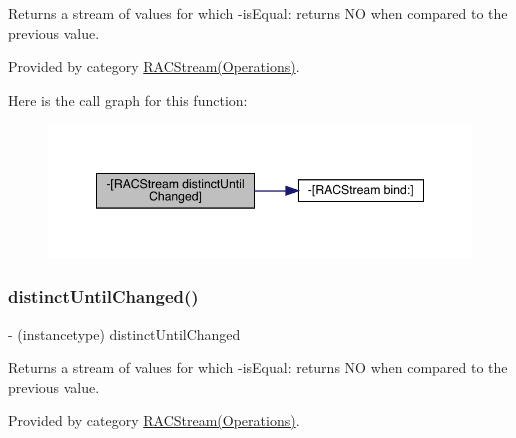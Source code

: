Returns a stream of values for which -\/is\+Equal\+: returns NO when compared to the previous value. 

Provided by category \mbox{\hyperlink{category_r_a_c_stream_07_operations_08_a3af010b929b0c232ddbaa52f574fb888}{R\+A\+C\+Stream(\+Operations)}}.

Here is the call graph for this function\+:\nopagebreak
\begin{figure}[H]
\begin{center}
\leavevmode
\includegraphics[width=348pt]{interface_r_a_c_stream_a3af010b929b0c232ddbaa52f574fb888_cgraph}
\end{center}
\end{figure}
\mbox{\label{interface_r_a_c_stream_a3af010b929b0c232ddbaa52f574fb888}} 
\subsubsection{\texorpdfstring{distinct\+Until\+Changed()}{distinctUntilChanged()}\hspace{0.1cm}{\footnotesize\ttfamily [2/3]}}
{\footnotesize\ttfamily -\/ (instancetype) distinct\+Until\+Changed \begin{DoxyParamCaption}{ }\end{DoxyParamCaption}}

Returns a stream of values for which -\/is\+Equal\+: returns NO when compared to the previous value. 

Provided by category \mbox{\hyperlink{category_r_a_c_stream_07_operations_08_a3af010b929b0c232ddbaa52f574fb888}{R\+A\+C\+Stream(\+Operations)}}.

\mbox{\label{interface_r_a_c_stream_a3af010b929b0c232ddbaa52f574fb888}} 
